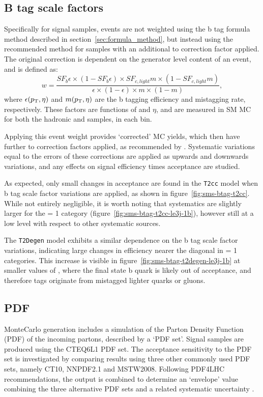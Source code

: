 \subsection{B tag scale factors}
Specifically for \FASTSIM signal samples, events are not weighted using the 
b tag formula method described in section~\ref{sec:formula_method}, but instead
using the 
recommended method for \FULLSIM samples with an additional \FULLSIM to \FASTSIM 
correction factor applied. The original correction is dependent on the generator
level content of an event, and is defined as:
% 
\begin{equation}
w = \frac{SF_b \epsilon \times (1-SF_b \epsilon) \times SF_{c,light} m \times (1
-SF_{c,light} m)}{\epsilon \times (1-\epsilon) \times m \times (1-m)} ,
\label{eq:btag_fullsim_weight}
\end{equation}
% 
where $\epsilon({p_{\text T}}, \eta)$ and $m({p_{\text T}}, \eta)$ are the b tagging efficiency and 
mistagging rate, respectively. These factors are functions of \Pt and $\eta$, and
are measured in SM MC for both the hadronic and \mj samples, in each \HT bin.

Applying this event weight provides `corrected' MC yields, which then 
have further \FASTSIM to \FULLSIM correction factors applied, as recommended by
\cite{btagpogtwiki}.
Systematic variations equal to the errors of these corrections are applied as 
upwards and downwards variations, and any effects on signal efficiency times 
acceptance are studied.

As expected, only small changes in acceptance are found in the \texttt{T2cc} 
model when b tag scale factor variations are applied, as shown in
figure~\ref{fig:sms-btag-t2cc}. While not entirely negligible, it is worth 
noting that systematics are slightly larger for the \nb= 1 category
(figure~\ref{fig:sms-btag-t2cc-le3j-1b}), however still at a low level with 
respect to other systematic sources.

The \texttt{T2Degen} model exhibits a similar dependence on the b tag scale
factor variations, indicating large changes in efficiency nearer the diagonal in
\nb = 1 categories. This increase is visible in
figure~\ref{fig:sms-btag-t2degen-le3j-1b} at smaller values of \deltam, where
the final state b quark is likely out of acceptance, and therefore tags
originate from mistagged lighter quarks or gluons.


\subsection{PDF}
MonteCarlo generation includes a simulation of the Parton Density Function (PDF)
of the incoming partons, described by a `PDF set'. Signal samples are produced
using the \textsc{CTEQ6L1} PDF set. The acceptance 
sensitivity to the PDF set is investigated by comparing results using three
other commonly used PDF sets, namely \textsc{CT10}, \textsc{NNPDF2.1} and
\textsc{MSTW2008}. Following PDF4LHC recommendations, the output is 
combined to determine an `envelope' value combining the three alternative PDF 
sets and a related systematic uncertainty \cite{pdf4lhc}.

